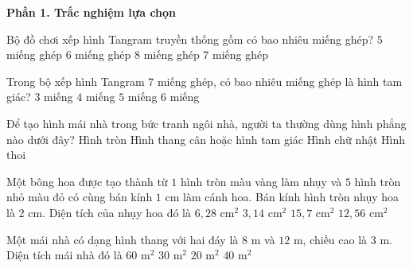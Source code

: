 \textbf{Phần 1. Trắc nghiệm lựa chọn}

\begin{ex} %
Bộ đồ chơi xếp hình Tangram truyền thống gồm có bao nhiêu miếng ghép?
\choice
{$5$ miếng ghép}
{$6$ miếng ghép}
{$8$ miếng ghép}
{\True $7$ miếng ghép}
\end{ex}

\begin{ex} %
Trong bộ xếp hình Tangram $7$ miếng ghép, có bao nhiêu miếng ghép là hình tam giác?
\choice
{$3$ miếng}
{$4$ miếng}
{\True $5$ miếng}
{$6$ miếng}
\end{ex}

\begin{ex} %
Để tạo hình mái nhà trong bức tranh ngôi nhà, người ta thường dùng hình phẳng nào dưới đây?
\choice
{Hình tròn}
{\True Hình thang cân hoặc hình tam giác}
{Hình chữ nhật}
{Hình thoi}
\end{ex}

\begin{ex} %
Một bông hoa được tạo thành từ $1$ hình tròn màu vàng làm nhụy và $5$ hình tròn nhỏ màu đỏ có cùng bán kính $1\text{ cm}$ làm cánh hoa. Bán kính hình tròn nhụy hoa là $2\text{ cm}$. Diện tích của nhụy hoa đó là
\choice
{$6{,}28\text{ cm}^2$}
{$3{,}14\text{ cm}^2$}
{$15{,}7\text{ cm}^2$}
{\True $12{,}56\text{ cm}^2$}
\end{ex}

\begin{ex} %
Một mái nhà có dạng hình thang với hai đáy là $8\text{ m}$ và $12\text{ m}$, chiều cao là $3\text{ m}$. Diện tích mái nhà đó là
\choice
{$60\text{ m}^2$}
{\True $30\text{ m}^2$}
{$20\text{ m}^2$}
{$40\text{ m}^2$}
\end{ex}

